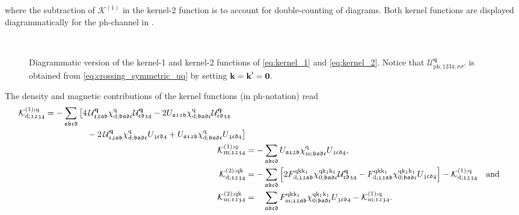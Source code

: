 \documentclass[../../main.tex]{subfiles}
\begin{document}
where the subtraction of $\mathcal{K}^{(1)}$ in the kernel-2 function is to account for double-counting of diagrams. Both kernel functions are displayed diagrammatically for the ph-channel in .
\begin{figure}[h]
  \centering
  \subfloat{}\vspace{0.5cm}\\
  \subfloat{}
  \caption{Diagrammatic version of the kernel-1 and kernel-2 functions of \eqref{eq:kernel_1} and \eqref{eq:kernel_2}. Notice that $\mathcal{U}^{\textbf{q}}_{\text{ph};\mathfrak{1234};\sigma\sigma'}$ is obtained from \eqref{eq:crossing_symmetric_uq} by setting $\textbf{k}=\textbf{k}'=\textbf{0}.$}
  \label{fig:kernel_functions}
\end{figure}
The density and magnetic contributions of the kernel functions (in ph-notation) read
\begin{subequations}
\begin{align}
\begin{split}
	\mathcal{K}^{(1);\text{q}}_{\text{d};\mathfrak{1234}}&=-\sum_{\mathfrak{abcd}}\big [4\,\mathcal{U}^{\textbf{q}}_{\mathfrak{12ab}} \chi^{\text{q}}_{\text{d};\mathfrak{badc}} \mathcal{U}^{\textbf{q}}_{\mathfrak{cd34}} - 2 U_{\mathfrak{a12b}} \chi^{\text{q}}_{\text{d};\mathfrak{badc}} \mathcal{U}^{\textbf{q}}_{\mathfrak{cd34}} \\
	&\qquad\qquad\quad - 2 \,\mathcal{U}^{\textbf{q}}_{\mathfrak{12ab}} \chi^{\text{q}}_{\text{d};\mathfrak{badc}} U_{\mathfrak{3cd4}} + U_{\mathfrak{a12b}} \chi^{\text{q}}_{\text{d};\mathfrak{badc}} U_{\mathfrak{3cd4}}\big ]
\end{split}\\
	\mathcal{K}^{(1);\text{q}}_{\text{m};\mathfrak{1234}}&=-\sum_{\mathfrak{abcd}} U_{\mathfrak{a12b}} \chi^{\text{q}}_{\text{m};\mathfrak{badc}} U_{\mathfrak{3cd4}},\\
	\mathcal{K}^{(2);\text{q}\text{k}}_{\text{d};\mathfrak{1234}}&=- \sum_{\mathfrak{abcd}} \left [2 F^{\text{q}\text{k}\text{k}_1}_{\text{d};\mathfrak{12ab}} \chi^{\text{q}\text{k}_1\text{k}_1}_{0;\mathfrak{badc}} \mathcal{U}^{\textbf{q}}_{\mathfrak{cd34}}  - F^{\text{q}\text{k}\text{k}_1}_{\text{d};\mathfrak{12ab}} \chi^{\text{q}\text{k}_1\text{k}_1}_{0;\mathfrak{badc}} U_{\mathfrak{3cd4}}\right ] - \mathcal{K}^{(1);\text{q}}_{\text{d};\mathfrak{1234}}\quad\text{and}\\
	\mathcal{K}^{(2);\text{q}\text{k}}_{\text{m};\mathfrak{1234}}&=\phantom{-}\sum_{\mathfrak{abcd}} F^{\text{q}\text{k}\text{k}_1}_{\text{m};\mathfrak{12ab}} \chi^{\text{q}\text{k}_1\text{k}_1}_{0;\mathfrak{badc}} U_{\mathfrak{3cd4}} - \mathcal{K}^{(1);\text{q}}_{\text{m};\mathfrak{1234}}.
\end{align}
\end{subequations}
\end{document}
